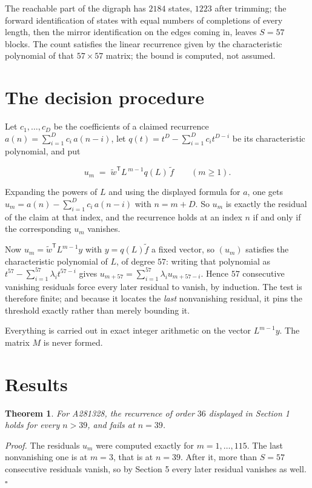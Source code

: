 \documentclass[11pt]{article}
\newtheorem{theorem}{Theorem}
\theoremstyle{definition}
\begin{document}
The reachable part of the digraph has $2184$ states, $1223$ after trimming; the forward identification of states with equal numbers of completions of every length, then the mirror identification on the edges coming in, leaves $S = 57$ blocks. The count satisfies the linear recurrence given by the characteristic polynomial of that $57\times57$ matrix; the bound is computed, not assumed.

\section{The decision procedure}

Let $c_1,\dots,c_D$ be the coefficients of a claimed recurrence $a(n) = \sum_{i=1}^{D} c_i\,a(n-i)$, let $q(t) = t^{D} - \sum_{i=1}^{D} c_i t^{D-i}$ be its characteristic polynomial, and put

\[u_m \;=\; \tilde w^{\mathsf T} L^{\,m-1} q(L)\,\tilde f \qquad (m \ge 1).\]

Expanding the powers of $L$ and using the displayed formula for $a$, one gets $u_m = a(n) - \sum_{i=1}^{D} c_i\,a(n-i)$ with $n = m + D$. So $u_m$ is exactly the residual of the claim at that index, and the recurrence holds at an index $n$ if and only if the corresponding $u_m$ vanishes.

Now $u_m = \tilde w^{\mathsf T} L^{m-1} y$ with $y = q(L)\tilde f$ a fixed vector, so $(u_m)$ satisfies the characteristic polynomial of $L$, of degree $57$: writing that polynomial as $t^{57} - \sum_{i=1}^{57} \lambda_i t^{57-i}$ gives $u_{m+57} = \sum_{i=1}^{57} \lambda_i u_{m+57-i}$. Hence $57$ consecutive vanishing residuals force every later residual to vanish, by induction. The test is therefore finite; and because it locates the {\itshape last} nonvanishing residual, it pins the threshold exactly rather than merely bounding it.

Everything is carried out in exact integer arithmetic on the vector $L^{m-1}y$. The matrix $M$ is never formed.

\section{Results}

\begin{theorem} For A281328, the recurrence of order $36$ displayed in Section 1 holds for every $n > 39$, and fails at $n = 39$.\end{theorem}

{\itshape Proof.} The residuals $u_m$ were computed exactly for $m = 1,\dots,115$. The last nonvanishing one is at $m = 3$, that is at $n = 39$. After it, more than $S = 57$ consecutive residuals vanish, so by Section 5 every later residual vanishes as well. $\square$
\end{document}
